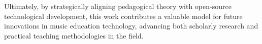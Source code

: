 \documentclass[runningheads]{llncs}
\begin{document}
Ultimately, by strategically aligning pedagogical theory with open-source technological development, this work contributes a valuable model for future innovations in music education technology, advancing both scholarly research and practical teaching methodologies in the field.








%
%
%
% 
% 
%
\appendix
\end{document}
